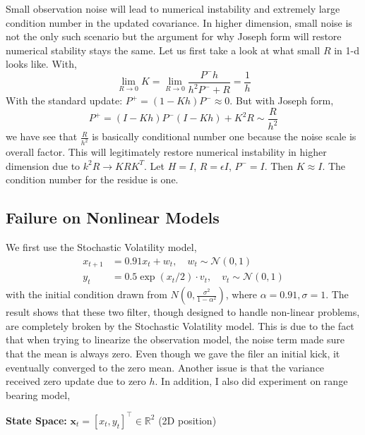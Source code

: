 \documentclass{article}
\begin{document}
Small observation noise will lead to numerical instability and extremely large condition number in the updated covariance. In higher dimension, small noise is not the only such scenario but the argument for why Joseph form will restore numerical stability stays the same. Let us first take a look at what small $R$ in 1-d looks like. With,
\begin{equation}
   \lim_{R\rightarrow 0} K =  \lim_{R\rightarrow 0} \frac{P^- h}{h^2 P^- + R} =  \frac{1}{h}
\end{equation}
With the standard update: $P^+ = (1 - K h) P^- \approx 0$. But with Joseph form, 
\begin{equation}
    P^+ = (I - K h) P^- (I - K h) + K^2 R \sim \frac{R}{h^2}
\end{equation}
we have see that $\frac{R}{h^2}$ is basically conditional number one because the noise scale is overall factor. This will legitimately restore numerical instability in higher dimension due to $k^2 R \rightarrow K R K^T$. Let $H = I$, $R = \epsilon I$, $P^- = I$. Then $K \approx I$. The condition number for the residue is one.




\subsection{Failure on Nonlinear Models}
We first use the Stochastic Volatility model,
\begin{align}
x_{t+1} &= 0.91 x_t +  w_t, \quad w_t \sim \mathcal{N}(0, 1) \\
y_t &= 0.5 \exp(x_t/2) \cdot v_t, \quad v_t \sim \mathcal{N}(0, 1)
\end{align}
with the initial condition drawn from $N(0,\frac{\sigma^2}{1-\alpha^2})$, where $\alpha=0.91, \sigma=1$.  The result shows that these two filter, though designed to handle non-linear problems, are completely broken by the Stochastic Volatility model. This is due to the fact that when trying to linearize the observation model, the noise term made sure that the mean is always zero. Even though we gave the filer an initial kick, it eventually converged to the zero mean. Another issue is that the variance received zero update due to zero $h$. In addition, I also did experiment on range bearing model,


\textbf{State Space:} $\mathbf{x}_t = [x_t, y_t]^\top \in \mathbb{R}^2$ (2D position)
\end{document}
